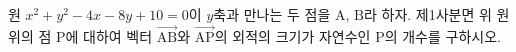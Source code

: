 원 $x^2 + y^2 - 4x - 8y + 10 = 0$이 $y$축과 만나는 두 점을 $\mathrm{A}$, $\mathrm{B}$라 하자.
제1사분면 위 원 위의 점 $\mathrm{P}$에 대하여 벡터 $\overrightarrow{\mathrm{AB}}$와 $\overrightarrow{\mathrm{AP}}$의 외적의 크기가 자연수인 $\mathrm{P}$의 개수를 구하시오.
